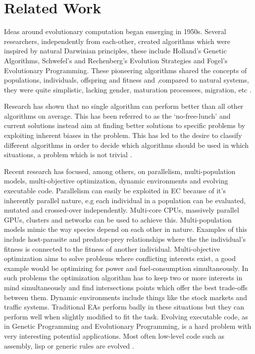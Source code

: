 \section{Related Work}

Ideas around evolutionary computation began emerging in 1950s. Several researchers, independently from each-other, created algorithms which were inspired by natural Darwinian principles, these include Holland's Genetic Algorithms, Schwefel's and Rechenberg's Evolution Strategies and Fogel's Evolutionary Programming. These pioneering algorithms shared the concepts of populations, individuals, offspring and fitness and ,compared to natural systems, they were quite simplistic, lacking gender, maturation processees, migration, etc \cite{dejong2009EC}.

Research has shown that no single algorithm can perform better than all other algorithms on average. This has been referred to as the `no-free-lunch' and current solutions instead aim at finding better solutions to specific problems by exploiting inherent biases in the problem. This has led to the desire to classify different algorithms in order to decide which algorithms should be used in which situations, a problem which is not trivial \cite{dejong2009EC}.

Recent research has focused, among others, on parallelism, multi-population models, multi-objective optimization, dynamic environments and evolving executable code. Parallelism can easily be exploited in EC because of it's inherently parallel nature, e.g each individual in a population can be evaluated, mutated and crossed-over independently. Multi-core CPUs, massively parallel GPUs, clusters and networks can be used to achieve this. Multi-population models mimic the way species depend on each other in nature. Examples of this include host-parasite and predator-prey relationships where the the individual's fitness is connected to the fitness of another individual. Multi-objective optimization aims to solve problems where conflicting interests exist, a good example would be optimizing for power and fuel-consumption simultaneously. In such problems the optimization algorithm has to keep two or more interests in mind simultaneously and find intersections points which offer the best trade-offs between them. Dynamic environments include things like the stock markets and traffic systems. Traditional EAs perform badly in these situations but they can perform well when slightly modified to fit the task. Evolving executable code, as in Genetic Programming and Evolutionary Programming, is a hard problem with very interesting potential applications. Most often low-level code such as assembly, lisp or generic rules are evolved \cite{dejong2009EC}.

